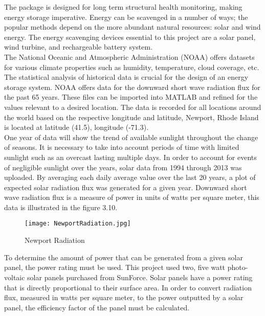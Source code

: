\indent The package is designed for long term structural health monitoring, making energy storage imperative.  Energy can be scavenged in a number of ways; the popular methods depend on the more abundant natural resources: solar and wind energy. The energy scavenging devices essential to this project are a solar panel, wind turbine, and rechargeable battery system.\\

\indent The National Oceanic and Atmospheric Administration (NOAA) offers datasets for various climate properties such as humidity, temperature, cloud coverage, etc. The statistical analysis of historical data is crucial for the design of an energy storage system. NOAA offers data for the downward short wave radiation flux for the past 65 years. These files can be imported into MATLAB and refined for the values relevant to a desired location. The data is recorded for all locations around the world based on the respective longitude and latitude, Newport, Rhode Island is located at latitude (41.5), longitude (-71.3). \\

\indent One year of data will show the trend of available sunlight throughout the change of seasons. It is necessary to take into account periods of time with limited sunlight such as an overcast lasting multiple days. In order to account for events of negligible sunlight over the years, solar data from 1994 through 2013 was uploaded. By averaging each daily average value over the last 20 years, a plot of expected solar radiation flux was generated for a given year. Downward short wave radiation flux is a measure of power in units of watts per square meter, this data is illustrated in the figure 3.10.

\begin{figure}[H]
\centering
\texttt{[image: NewportRadiation.jpg]}
\caption{Newport Radiation}
\label{fig:NewportRadtiation}
\end{figure}

\indent To determine the amount of power that can be generated from a given solar panel, the power rating must be used. This project used two, five watt photo-voltaic solar panels purchased from SunForce. Solar panels have a power rating that is directly proportional to their surface area. In order to convert radiation flux, measured in watts per square meter, to the power outputted by a solar panel, the efficiency factor of the panel must be calculated.

